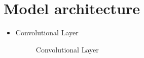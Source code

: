 \documentclass[12pt,oneside,openright,a4paper]{cpe-thai-project}
\begin{document}
  \section{Model architecture}
  \begin{itemize}
    \item Convolutional Layer
    \begin{figure}[!ht]\centering
      \setlength{\fboxrule}{0.2mm} %
      \setlength{\fboxsep}{1cm}
      \caption{Convolutional Layer}\label{fig:convolutionallayer}
     \end{figure}
  

\end{itemize}
\end{document}
